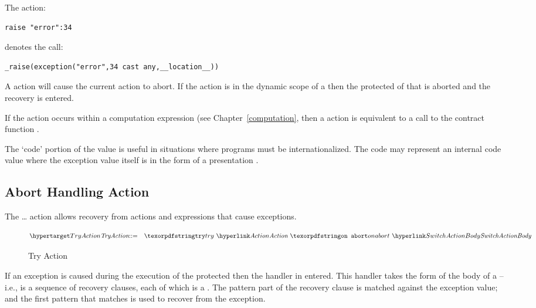 The action:
\begin{lstlisting}
raise "error":34
\end{lstlisting}
denotes the call:
\begin{lstlisting}
_raise(exception("error",34 cast any,__location__))
\end{lstlisting}

A  action will cause the current action to abort. If the  action is in the dynamic scope of a  then the protected  of that  is aborted and the recovery  is entered.

\begin{aside}
If the  action occurs within a computation expression (see Chapter~\vref{computation}, then a  action is equivalent to a call to the contract function .
\end{aside}

\begin{aside}
The `code' portion of the  value is useful in situations where programs must be internationalized. The code may represent an internal code value where the exception value itself is in the form of a presentation .
\end{aside}

\subsection{Abort Handling Action}
\label{except}
The  \ldots{}  action allows recovery from actions and expressions that cause exceptions.
\begin{figure}[htbp]
\begin{eqnarray*}
\ntDef{TryAction}&\arrow&\q{try}\ \ntRef{Action}\ \q{on abort}\ \ntRef{SwitchActionBody}
\end{eqnarray*}
\caption{Try Action}
\label{tryActionFig}
\end{figure}

If an exception is caused during the execution of the protected  then the handler in entered. This handler takes the form of the body of a  -- i.e., is a sequence of recovery clauses, each of which is a . The pattern part of the recovery clause is matched against the exception value; and the first pattern that matches is used to recover from the exception.

